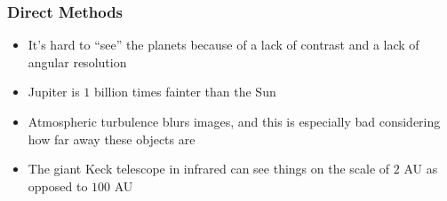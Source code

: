 \documentclass[class=article, crop=false]{standalone}
\begin{document}
  \subsubsection{Direct Methods}
  \begin{itemize}
    \item It's hard to ``see'' the planets because of a lack of contrast and a lack of angular resolution
    \item Jupiter is $1$ billion times fainter than the Sun
    \item Atmospheric turbulence blurs images, and this is especially bad considering how far away these objects are
    \item The giant Keck telescope in infrared can see things on the scale of $2$ AU as opposed to $100$ AU
  \end{itemize}
\end{document}
